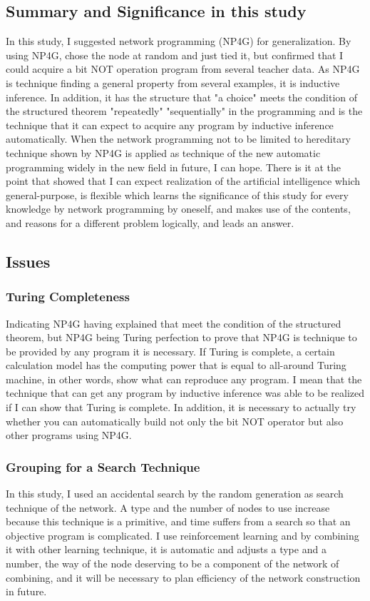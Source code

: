 \documentclass{article}
\begin{document}
\subsection {Summary and Significance in this study}
In this study, I suggested network programming (NP4G) for generalization.
By using NP4G, chose the node at random and just tied it, but confirmed that I could acquire a bit NOT operation program from several teacher data.
As NP4G is technique finding a general property from several examples, it is inductive inference.
In addition, it has the structure that "a choice" meets the condition of the structured theorem "repeatedly" "sequentially" in the programming and is the technique that it can expect to acquire any program by inductive inference automatically.
When the network programming not to be limited to hereditary technique shown by NP4G is applied as technique of the new automatic programming widely in the new field in future, I can hope.
There is it at the point that showed that I can expect realization of the artificial intelligence which general-purpose, is flexible which learns the significance of this study for every knowledge by network programming by oneself, and makes use of the contents, and reasons for a different problem logically, and leads an answer.

\subsection {Issues}
\subsubsection {Turing Completeness}
Indicating NP4G having explained that meet the condition of the structured theorem, but NP4G being Turing perfection to prove that NP4G is technique to be provided by any program it is necessary.
If Turing is complete, a certain calculation model has the computing power that is equal to all-around Turing machine, in other words, show what can reproduce any program.
I mean that the technique that can get any program by inductive inference was able to be realized if I can show that Turing is complete.
In addition, it is necessary to actually try whether you can automatically build not only the bit NOT operator but also other programs using NP4G.

\subsubsection {Grouping for a Search Technique}
In this study, I used an accidental search by the random generation as search technique of the network.
A type and the number of nodes to use increase because this technique is a primitive, and time suffers from a search so that an objective program is complicated.
I use reinforcement learning and by combining it with other learning technique, it is automatic and adjusts a type and a number, the way of the node deserving to be a component of the network of combining, and it will be necessary to plan efficiency of the network construction in future.
\end{document}
